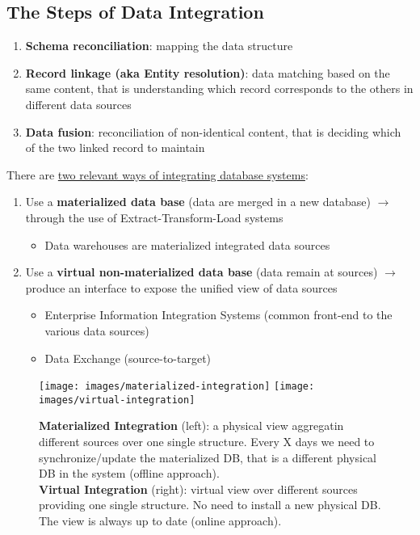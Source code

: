 \documentclass[10pt,a4paper]{article}
\begin{document}
\subsection{The Steps of Data Integration}
\begin{enumerate}
	\item \textbf{Schema reconciliation}: mapping the data structure
	\item \textbf{Record linkage (aka Entity resolution)}: data matching based on the same content, that is understanding which record corresponds to the others in different data sources
	\item \textbf{Data fusion}: reconciliation of non-identical content, that is deciding which of the two linked record to maintain
\end{enumerate}
There are \uline{two relevant ways of integrating database systems}:
\begin{enumerate}
	\item Use a \textbf{materialized data base} (data are merged in a new database) $\rightarrow$ through the use of Extract-Transform-Load systems
	\begin{itemize}
		\item Data warehouses are materialized integrated data sources
	\end{itemize}
	\item Use a \textbf{virtual non-materialized data base} (data remain at sources) $\rightarrow$ produce an interface to expose the unified view of data sources
	\begin{itemize}
		\item Enterprise Information Integration Systems (common front-end to the various data sources)
		\item Data Exchange (source-to-target)
	\end{itemize}
\end{enumerate}
\begin{figure}[htp]
\centering
\texttt{[image: images/materialized-integration]}\hfill
\texttt{[image: images/virtual-integration]}\hfill
\caption{\textbf{Materialized Integration} (left): a physical view aggregatin different sources over one single structure. Every X days we need to synchronize/update the materialized DB, that is a different physical DB in the system (offline approach). \\
\textbf{Virtual Integration} (right): virtual view over different sources providing one single structure. No need to install a new physical DB. The view is always up to date (online approach).}
\end{figure}
\end{document}
